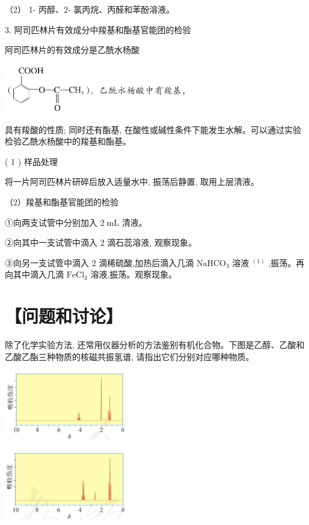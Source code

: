 \documentclass[10pt]{article}
\begin{document}
（2） 1- 丙醇、2- 氯丙烷、丙醛和苯酚溶液。

3. 阿司匹林片有效成分中羧基和酯基官能团的检验

阿司匹林片的有效成分是乙酰水杨酸

\begin{center}
\includegraphics[max width=0.6\textwidth]{images/0190efc5-b58a-7c43-bfb0-e0a030df9cfd_105_128258.jpg}
\end{center}

具有羧酸的性质; 同时还有酯基, 在酸性或碱性条件下能发生水解。可以通过实验检验乙酰水杨酸中的羧基和酯基。

( 1 ) 样品处理

将一片阿司匹林片研碎后放入适量水中, 振荡后静置, 取用上层清液。

（2）羧基和酯基官能团的检验

①向两支试管中分别加入 \(2\mathrm{\;{mL}}\) 清液。

②向其中一支试管中滴入 2 滴石蕊溶液, 观察现象。

③向另一支试管中滴入 2 滴稀硫酸,加热后滴入几滴 \({\mathrm{{NaHCO}}}_{3}\) 溶液 \({}^{\left( 1\right) }\) ,振荡。再向其中滴入几滴 \({\mathrm{{FeCl}}}_{3}\) 溶液,振荡。观察现象。

\section*{【问题和讨论】}

除了化学实验方法, 还常用仪器分析的方法鉴别有机化合物。下图是乙醇、乙酸和乙酸乙酯三种物质的核磁共振氢谱, 请指出它们分别对应哪种物质。

\begin{center}
\includegraphics[max width=0.4\textwidth]{images/0190efc5-b58a-7c43-bfb0-e0a030df9cfd_105_274908.jpg}
\end{center}

\begin{center}
\includegraphics[max width=0.4\textwidth]{images/0190efc5-b58a-7c43-bfb0-e0a030df9cfd_105_492217.jpg}
\end{center}
\end{document}
